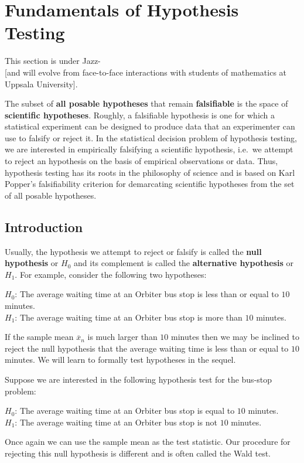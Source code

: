 \section{Fundamentals of Hypothesis Testing}\label{S:HypTest}
This section is under Jazz-\work\\{\scriptsize [and will evolve from face-to-face interactions with students of mathematics at Uppsala University]}.

The subset of {\bf all posable hypotheses} that remain {\bf falsifiable} is the space of {\bf scientific hypotheses}.  Roughly, a falsifiable hypothesis is one for which a statistical experiment can be designed to produce data that an experimenter can use to falsify or reject it.  In the statistical decision problem of hypothesis testing, we are interested in empirically falsifying a scientific hypothesis, i.e.~we attempt to reject an hypothesis on the basis of empirical observations or data.  Thus, hypothesis testing has its roots in the philosophy of science and is based on Karl Popper's falsifiability criterion for demarcating scientific hypotheses from the set of all posable hypotheses.

\subsection{Introduction}\label{S:HypTestIntro}
Usually, the hypothesis we attempt to reject or falsify is called the {\bf null hypothesis} or $H_0$ and its complement is called the {\bf alternative hypothesis} or $H_1$.  For example, consider the following two hypotheses:

$H_0$:  The average waiting time at an Orbiter bus stop is less than or equal to $10$ minutes.\\
$H_1$:  The average waiting time at an Orbiter bus stop is more than $10$ minutes.

If the sample mean $\overline{x}_n$ is much larger than $10$ minutes then we may be inclined to reject the null hypothesis that the average waiting time is less than or equal to $10$ minutes.  We will learn to formally test hypotheses in the sequel.

Suppose we are interested in the following hypothesis test for the bus-stop  problem:

$H_0$:  The average waiting time at an Orbiter bus stop is equal to $10$ minutes.\\
$H_1$:  The average waiting time at an Orbiter bus stop is not $10$ minutes.

Once again we can use the sample mean as the test statistic.  Our procedure for rejecting this null hypothesis is different and is often called the Wald test.

